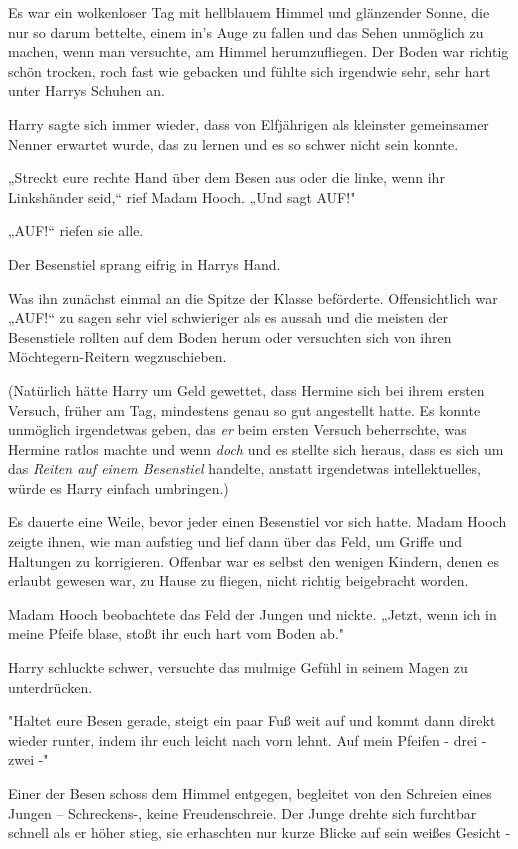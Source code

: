 {Es war ein wolkenloser Tag mit hellblauem Himmel und glänzender Sonne, die nur so darum bettelte, einem in's Auge zu fallen und das Sehen unmöglich zu machen, wenn man versuchte, am Himmel herumzufliegen. Der Boden war richtig schön trocken, roch fast wie gebacken und fühlte sich irgendwie sehr, sehr hart unter Harrys Schuhen an.

Harry sagte sich immer wieder, dass von Elfjährigen als kleinster gemeinsamer Nenner erwartet wurde, das zu lernen und es so schwer nicht sein konnte.

„Streckt eure rechte Hand über dem Besen aus oder die linke, wenn ihr Linkshänder seid,“ rief Madam Hooch. „Und sagt AUF!"

„AUF!“ riefen sie alle.

Der Besenstiel sprang eifrig in Harrys Hand.

Was ihn zunächst einmal an die Spitze der Klasse beförderte. Offensichtlich war „AUF!“ zu sagen sehr viel schwieriger als es aussah und die meisten der Besenstiele rollten auf dem Boden herum oder versuchten sich von ihren Möchtegern-Reitern wegzuschieben.

(Natürlich hätte Harry um Geld gewettet, dass Hermine sich bei ihrem ersten Versuch, früher am Tag, mindestens genau so gut angestellt hatte. Es konnte unmöglich irgendetwas geben, das \emph{er} beim ersten Versuch beherrschte, was Hermine ratlos machte und wenn \emph{doch} und es stellte sich heraus, dass es sich um das \emph{Reiten auf einem Besenstiel} handelte, anstatt irgendetwas intellektuelles, würde es Harry einfach umbringen.)

Es dauerte eine Weile, bevor jeder einen Besenstiel vor sich hatte. Madam Hooch zeigte ihnen, wie man aufstieg und lief dann über das Feld, um Griffe und Haltungen zu korrigieren. Offenbar war es selbst den wenigen Kindern, denen es erlaubt gewesen war, zu Hause zu fliegen, nicht richtig beigebracht worden.

Madam Hooch beobachtete das Feld der Jungen und nickte. „Jetzt, wenn ich in meine Pfeife blase, stoßt ihr euch hart vom Boden ab."

Harry schluckte schwer, versuchte das mulmige Gefühl in seinem Magen zu unterdrücken.

"Haltet eure Besen gerade, steigt ein paar Fuß weit auf und kommt dann direkt wieder runter, indem ihr euch leicht nach vorn lehnt. Auf mein Pfeifen - drei - zwei -"

Einer der Besen schoss dem Himmel entgegen, begleitet von den Schreien eines Jungen -- Schreckens-, keine Freudenschreie. Der Junge drehte sich furchtbar schnell als er höher stieg, sie erhaschten nur kurze Blicke auf sein weißes Gesicht -

}
